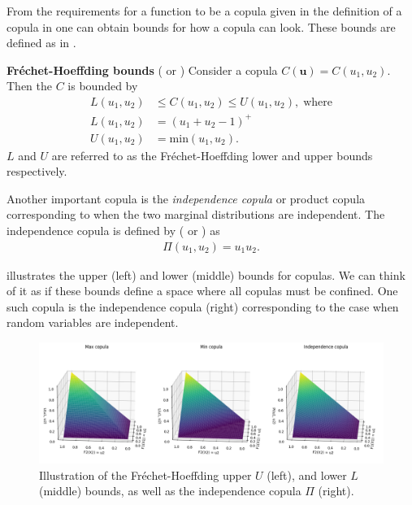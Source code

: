 From the requirements for a function to be a copula given in the definition of a copula in  one can obtain bounds for how a copula can look. These bounds are defined as in .
    
\begin{theorem}\label{thm:FrechetBounds}
    \textbf{Fréchet-Hoeffding bounds} (\citet[p.~7]{Schmidt2006} or \citet[p.~11]{Nelsen2006})
    Consider a copula $C(\mathbf{u}) = C(u_1,u_2)$. Then the $C$ is bounded by
    \begin{align*}
        L(u_1,u_2) &\leq C(u_1,u_2) \leq U(u_1,u_2),\; \mathrm{ where}\\
        L(u_1,u_2) &= (u_1+u_2-1)^+\\
        U(u_1,u_2) &= \mathrm{min}(u_1,u_2).
    \end{align*}
    $L$ and $U$ are referred to as the Fréchet-Hoeffding lower and upper bounds respectively. 
\end{theorem}

Another important copula is the \emph{independence copula} or product copula corresponding to when the two marginal distributions are independent. The independence copula is defined by (\citet[p.~712]{BrigoMercurio2006} or \citet[p.~7]{Schmidt2006}) as
\begin{align*}
    \Pi(u_1,u_2) = u_1u_2.
\end{align*}

 illustrates the upper (left) and lower (middle) bounds for copulas. We can think of it as if these bounds define a space where all copulas must be confined. One such copula is the independence copula (right) corresponding to the case when random variables are independent. 

\begin{figure}
    \centering
    \includegraphics[width=1.\linewidth]{3Theory/pictures/FrechetBounds.png}
    \caption{Illustration of the Fréchet-Hoeffding upper $U$ (left), and lower $L$ (middle) bounds, as well as the independence copula $\Pi$ (right).}
    \label{fig:FrechetBounds}
\end{figure}


